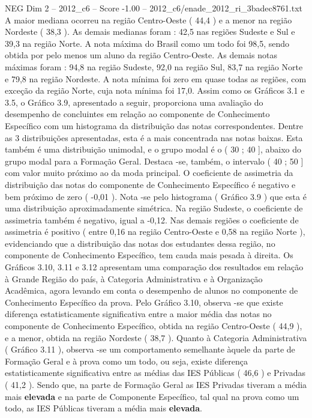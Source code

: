 \begin{textsample}{NEG Dim 2 – 2012\_c6 – Score -1.00 – 2012\_c6/enade\_2012\_ri\_3badec8761.txt}
A maior mediana ocorreu na região Centro-Oeste ( 44,4 ) e a menor na região Nordeste ( 38,3 ).
As demais medianas foram : 42,5 nas regiões Sudeste e Sul e 39,3 na região Norte.
A nota máxima do Brasil como um todo foi 98,5, sendo obtida por pelo menos um aluno da região Centro-Oeste.
As demais notas máximas foram : 94,8 na região Sudeste, 92,0 na região Sul, 83,7 na região Norte e 79,8 na região Nordeste.
A nota mínima foi zero em quase todas as regiões, com exceção da região Norte, cuja nota mínima foi 17,0.
Assim como os Gráficos 3.1 e 3.5, o Gráfico 3.9, apresentado a seguir, proporciona uma avaliação do desempenho de concluintes em relação ao componente de Conhecimento Específico com um histograma da distribuição das notas correspondentes.
Dentre as 3 distribuições apresentadas, esta é a mais concentrada nas notas baixas.
Esta também é uma distribuição unimodal, e o grupo modal é o ( 30 ; 40 ], abaixo do grupo modal para a Formação Geral.
Destaca -se, também, o intervalo ( 40 ; 50 ] com valor muito próximo ao da moda principal.
O coeficiente de assimetria da distribuição das notas do componente de Conhecimento Específico é negativo e bem próximo de zero ( -0,01 ).
Nota -se pelo histograma ( Gráfico 3.9 ) que esta é uma distribuição aproximadamente simétrica.
Na região Sudeste, o coeficiente de assimetria também é negativo, igual a -0,12.
Nas demais regiões o coeficiente de assimetria é positivo ( entre 0,16 na região Centro-Oeste e 0,58 na região Norte ), evidenciando que a distribuição das notas dos estudantes dessa região, no componente de Conhecimento Específico, tem cauda mais pesada à direita.
Os Gráficos 3.10, 3.11 e 3.12 apresentam uma comparação dos resultados em relação à Grande Região do país, à Categoria Administrativa e à Organização Acadêmica, agora levando em conta o desempenho de alunos no componente de Conhecimento Específico da prova.
Pelo Gráfico 3.10, observa -se que existe diferença estatisticamente significativa entre a maior média das notas no componente de Conhecimento Específico, obtida na região Centro-Oeste ( 44,9 ), e a menor, obtida na região Nordeste ( 38,7 ).
Quanto à Categoria Administrativa ( Gráfico 3.11 ), observa -se um comportamento semelhante àquele da parte de Formação Geral e à prova como um todo, ou seja, existe diferença estatisticamente significativa entre as médias das IES Públicas ( 46,6 ) e Privadas ( 41,2 ).
Sendo que, na parte de Formação Geral as IES Privadas tiveram a média mais \textbf{elevada} e na parte de Componente Específico, tal qual na prova como um todo, as IES Públicas tiveram a média mais \textbf{elevada}.

\end{textsample}
